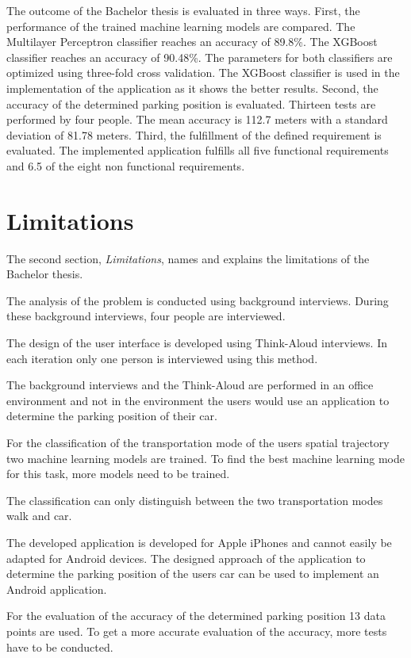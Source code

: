 The outcome of the Bachelor thesis is evaluated in three ways. First, the performance of the trained machine learning models are compared. The Multilayer Perceptron classifier reaches an accuracy of 89.8\%. The XGBoost classifier reaches an accuracy of 90.48\%. The parameters for both classifiers are optimized using three-fold cross validation. The XGBoost classifier is used in the implementation of the application as it shows the better results. Second, the accuracy of the determined parking position is evaluated. Thirteen tests are performed by four people. The mean accuracy is 112.7 meters with a standard deviation of 81.78 meters. Third, the fulfillment of the defined requirement is evaluated. The implemented application fulfills all five functional requirements and 6.5 of the eight non functional requirements. 


\section{Limitations}
The second section, \textit{Limitations}, names and explains the limitations of the Bachelor thesis. 

The analysis of the problem is conducted using background interviews. During these background interviews, four people are interviewed. 

The design of the user interface is developed using Think-Aloud interviews. In each iteration only one person is interviewed using this method. 

The background interviews and the Think-Aloud are performed in an office environment and not in the environment the users would use an application to determine the parking position of their car.  

For the classification of the transportation mode of the users spatial trajectory two machine learning models are trained. To find the best machine learning mode for this task, more models need to be trained.

The classification can only distinguish between the two transportation modes walk and car. 

The developed application is developed for Apple iPhones and cannot easily be adapted for Android devices. The designed approach of the application to determine the parking position of the users car can be used to implement an Android application. 

For the evaluation of the accuracy of the determined parking position 13 data points are used. To get a more accurate evaluation of the accuracy, more tests have to be conducted. 


